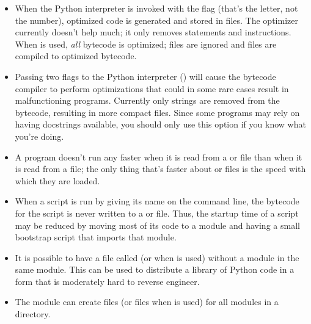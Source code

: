 \documentclass{manual}
\begin{document}
\begin{itemize}

\item
When the Python interpreter is invoked with the  flag (that's
the letter, not the number), optimized code is generated and stored in
 files.  The optimizer currently doesn't help much; it only
removes  statements and  instructions.
When  is used, \emph{all} bytecode is optimized;
 files are ignored and  files are compiled to
optimized bytecode.

\item
Passing two  flags to the Python interpreter ()
will cause the bytecode compiler to perform optimizations that could
in some rare cases result in malfunctioning programs.  Currently only
 strings are removed from the bytecode, resulting in more 
compact  files.  Since some programs may rely on having
docstrings available, you should only use this option if you know what
you're doing.


\item
A program doesn't run any faster when it is read from a  or
 file than when it is read from a  file; the only
thing that's faster about  or  files is the
speed with which they are loaded.

\item
When a script is run by giving its name on the command line, the
bytecode for the script is never written to a  or
 file.  Thus, the startup time of a script may be reduced
by moving most of its code to a module and having a small bootstrap
script that imports that module.

\item
It is possible to have a file called  (or
 when  is used) without a module
 in the same module.  This can be used to distribute
a library of Python code in a form that is moderately hard to reverse
engineer.

\item
The module  can create
 files (or  files when  is used) for
all modules in a directory.

\end{itemize}
\end{document}
